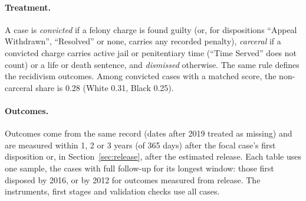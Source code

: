 \documentclass[11pt]{article}
\begin{document}
\paragraph{Treatment.} A case is \emph{convicted} if a felony charge is found guilty (or, for dispositions ``Appeal Withdrawn'', ``Resolved'' or none, carries any recorded penalty), \emph{carceral} if a convicted charge carries active jail or penitentiary time (``Time Served'' does not count) or a life or death sentence, and \emph{dismissed} otherwise. The same rule defines the recidivism outcomes. Among convicted cases with a matched score, the non-carceral share is 0.28 (White 0.31, Black 0.25).

\paragraph{Outcomes.} Outcomes come from the same record (dates after 2019 treated as missing) and are measured within 1, 2 or 3 years (of 365 days) after the focal case's first disposition or, in Section~\ref{sec:release}, after the estimated release. Each table uses one sample, the cases with full follow-up for its longest window: those first disposed by 2016, or by 2012 for outcomes measured from release. The instruments, first stages and validation checks use all cases.
\end{document}
